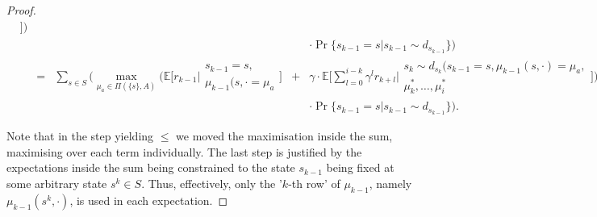 \documentclass[11pt]{article} %
\begin{document}
\begin{proof}
\begin{equation}
\begin{array}{rrccl}
\begin{array}{c}
																																															\end{array} \Big] \Big) \\
		&		&		& 	& \cdot  \Pr\{ s_{k-1} = s | s_{k-1} \sim d_{s_{k-1}} \} \Big) \\
		& = 	&	\sum\limits_{s \in S}^{} \Big( \max\limits_{\mu_a \in \Pi(\{s\},A)} \Big( \mathbb{E}\Big[ r_{k-1} \Big| \begin{array}{c}
																						s_{k-1} = s, \\
																						\mu_{k-1}(s,\cdot = \mu_a
																					\end{array} \Big]  & + & \gamma  \cdot \mathbb{E} \Big[ \sum\limits_{l=0}^{i-k} \gamma^l r_{k+l} \Big| \begin{array}{c}
																																																s_k \sim d_{s_k}(s_{k-1} = s,\mu_{k-1}(s,\cdot) = \mu_a, \\
																																																\mu_k^*,\dots,\mu_i^*
																																															\end{array} \Big] \Big) \\
		&		&		& 	& \cdot  \Pr\{ s_{k-1} = s | s_{k-1} \sim d_{s_{k-1}} \} \Big).
	\end{array}
\end{equation}

Note that in the step yielding $\le$ we moved the maximisation inside the sum, maximising over each term individually. The last step is justified by the expectations inside the sum being constrained to the state $s_{k-1}$ being fixed at some arbitrary state $s^k \in S$. Thus, effectively, only the '$k$-th row' of $\mu_{k-1}$, namely $\mu_{k-1}(s^k,\cdot)$, is used in each expectation.

\end{proof}
\end{document}
